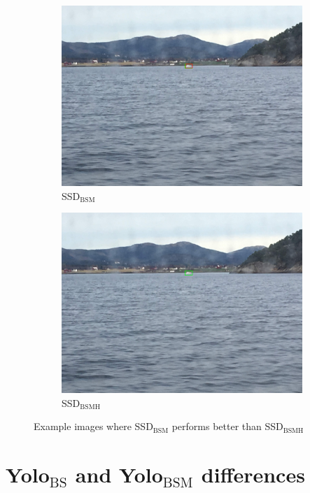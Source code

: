 \begin{figure}[h!]
\begin{subfigure}{.5\textwidth}
  \centering
  \includegraphics[width=0.8\linewidth]{results/case_buildings/ssdtrf/ssd2/2better/IMG_2463.jpg}
  \caption{SSD$_{\text{BSM}}$}
\end{subfigure}%
\begin{subfigure}{.5\textwidth}
  \centering
  \includegraphics[width=.8\linewidth]{results/case_buildings/ssdtrf/ssd3/2better/IMG_2463.jpg}
  \caption{SSD$_{\text{BSMH}}$}
\end{subfigure}
\caption{Example images where SSD$_{\text{BSM}}$ performs better than SSD$_{\text{BSMH}}$}
\label{img:ssd_trf_3better}
\end{figure}


\section{Yolo$_{\text{BS}}$ and Yolo$_{\text{BSM}}$ differences}

